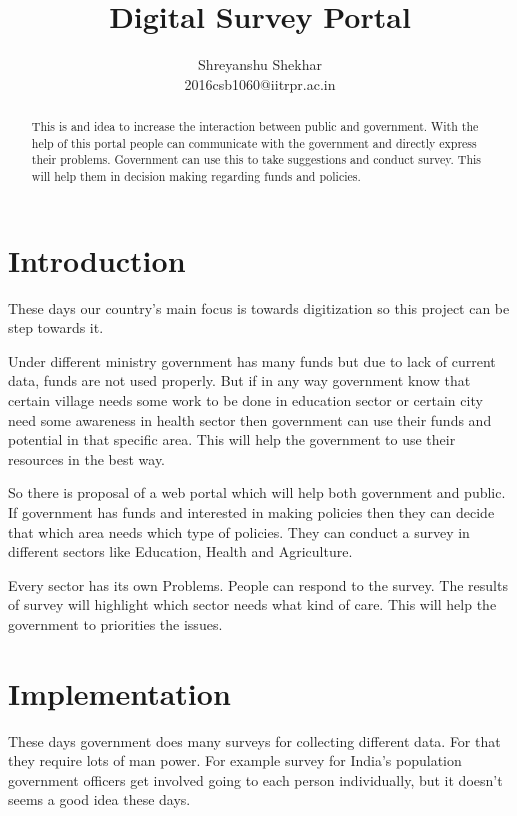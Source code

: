 \documentclass[journal]{IEEEtran}
\begin{document}
\title{Digital Survey Portal}

\author{

Shreyanshu Shekhar\\
2016csb1060@iitrpr.ac.in

}


\maketitle
\begin{abstract}
This is and idea to increase the interaction between public and government. With the help of this portal people can communicate with the government and directly express their problems. Government can use this to take suggestions and conduct survey. This will help them in decision making regarding funds and policies.

\end{abstract}


\section{Introduction}
These days our country's main focus is towards digitization so this project can be step towards it.

Under different ministry government has many funds but due to lack of current data, funds are not used properly. But if in any way government know that certain village needs some work to be done in education sector or certain city need some awareness in health sector then government can use their funds and potential in that specific area. This will help the government to use their resources in the best way. 

So there is proposal of a web portal which will help both government and public. If government has funds and interested in making policies then they can decide that which area needs which type of policies. They can conduct a survey in different sectors like Education, Health and Agriculture. 

Every sector has its own Problems. People can respond to the survey. The results of survey will highlight which sector needs what kind of care. This will help the government to priorities the issues. 

\section{Implementation}
These days government does many surveys for collecting different data. For that they require lots of man power. For example survey for India's population government officers get involved going to each person individually, but it doesn't seems a good idea these days.
\end{document}
